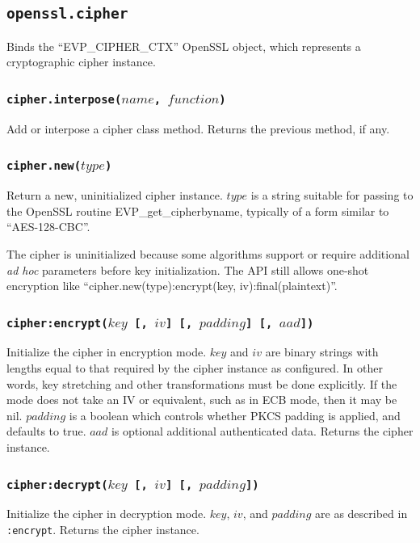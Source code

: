 \documentclass[11pt, oneside]{memoir}
\newcommand*{\fn}[1]{\texttt{#1}\xspace}
\newcounter{toccols}
\newenvironment{Module}[1]{
	\subsection{\texttt{#1}}
	\addtocontents{toc}{
		\protect\begin{multicols}{\value{toccols}}
	}
}{
	\addtocontents{toc}{\protect\end{multicols}}
}
\begin{document}
\begin{Module}{openssl.cipher}

Binds the ``EVP\_CIPHER\_CTX'' OpenSSL object, which represents a cryptographic cipher instance.

\subsubsection[\fn{cipher.interpose}]{\fn{cipher.interpose($name$, $function$)}}

Add or interpose a cipher class method. Returns the previous method, if any.

\subsubsection[\fn{cipher.new}]{\fn{cipher.new($type$)}}

Return a new, uninitialized cipher instance. $type$ is a string suitable for passing to the OpenSSL routine EVP\_get\_cipherbyname, typically of a form similar to ``AES-128-CBC''.

The cipher is uninitialized because some algorithms support or require additional \textit{ad hoc} parameters before key initialization. The API still allows one-shot encryption like ``cipher.new(type):encrypt(key, iv):final(plaintext)''.

\subsubsection[\fn{cipher:encrypt}]{\fn{cipher:encrypt($key$ [, $iv$] [, $padding$] [, $aad$])}}

Initialize the cipher in encryption mode. $key$ and $iv$ are binary strings with lengths equal to that required by the cipher instance as configured. In other words, key stretching and other transformations must be done explicitly. If the mode does not take an IV or equivalent, such as in ECB mode, then it may be nil. $padding$ is a boolean which controls whether PKCS padding is applied, and defaults to true. $aad$ is optional additional authenticated data. Returns the cipher instance.

\subsubsection[\fn{cipher:decrypt}]{\fn{cipher:decrypt($key$ [, $iv$] [, $padding$])}}

Initialize the cipher in decryption mode. $key$, $iv$, and $padding$ are as described in \fn{:encrypt}. Returns the cipher instance.


\end{Module}
\end{document}

